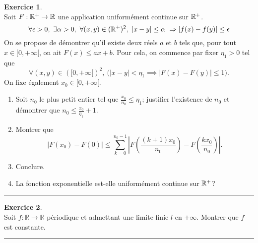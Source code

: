 \documentclass[a4paper,11pt]{article}
\theoremstyle{definition}
\newtheorem{exo}{Exercice} %
\begin{document}
\begin{exo}\textit{}\quad\\[0.25cm]
	
	Soit $F:\mathbb{R}^+ \to \mathbb{R}$ une application uniformément continue sur $\mathbb{R}^+$.\\[-0.5cm] 
	$$\forall\epsilon>0,\ \exists \alpha>0 , \ \forall(x,y) \in (\mathbb{R}^+)^2, \ |x-y|\leq\alpha \ \Large\Rightarrow |f(x)-f(y)|\leq \epsilon $$ On se propose de démontrer qu'il existe
	deux réels $a$ et $b$ tels que, pour tout $x\in[0,+\infty[$, on ait $F(x)\leq ax+b$. Pour cela, on commence par fixer $\eta_1>0$
	tel que 
	$$\forall (x,y)\in([0,+\infty[)^2,\ \big(|x-y|<\eta_1\implies |F(x)-F(y)|\leq 1\big).$$
	On fixe également $x_0\in[0,+\infty[$.
	\begin{enumerate}
		\item Soit $n_0$ le plus petit entier tel que $\frac{x_0}{n_0}\leq \eta_1$; justifier l'existence de $n_0$ et démontrer que $n_0\leq \frac{x_0}{\eta_1}+1$.
		\item Montrer que 
		$$|F(x_0)-F(0)|\leq \sum_{k=0}^{n_0-1}\left|F\left(\frac{(k+1)x_0}{n_0}\right)-F\left(\frac{kx_0}{n_0}\right)\right|.$$
		\item Conclure.
		\item La fonction exponentielle est-elle uniformément continue sur $\mathbb{R}^+$?
	\end{enumerate}
	
	\centering
	\rule{1\linewidth}{0.6pt}
\end{exo}
\begin{exo}\textit{}\quad\\[0.25cm]%
	Soit $f:\mathbb R\to\mathbb R$ périodique et admettant une limite finie $l$ en $+\infty$. Montrer que $f$ est constante.
	
	
	\centering
	\rule{1\linewidth}{0.6pt}
\end{exo}


	
		
\end{document}
